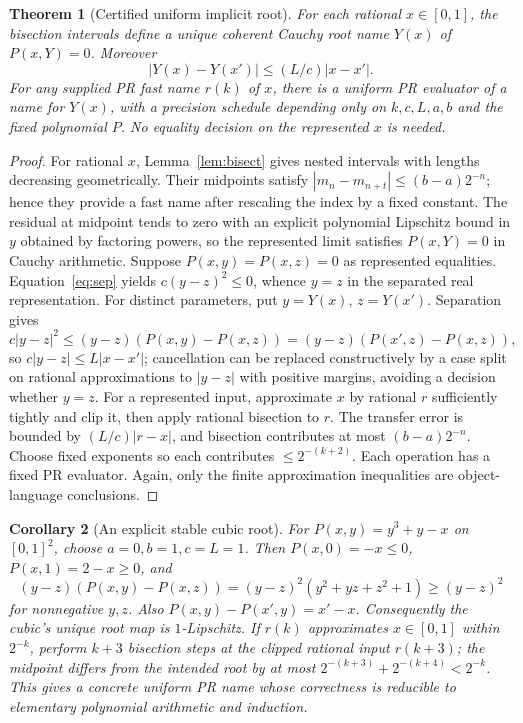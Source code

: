 \documentclass[11pt]{article}
\newtheorem{theorem}{Theorem}[section]
\newtheorem{corollary}[theorem]{Corollary}
\begin{document}
\begin{theorem}[Certified uniform implicit root]\label{thm:implicit}
For each rational $x\in[0,1]$, the bisection intervals define a unique coherent Cauchy root name $Y(x)$ of $P(x,Y)=0$. Moreover
\[
|Y(x)-Y(x')|\le (L/c)|x-x'|.
\]
For any supplied PR fast name $r(k)$ of $x$, there is a uniform PR evaluator of a name for $Y(x)$, with a precision schedule depending only on $k,c,L,a,b$ and the fixed polynomial $P$. No equality decision on the represented $x$ is needed.
\end{theorem}
\begin{proof}
For rational $x$, Lemma~\ref{lem:bisect} gives nested intervals with lengths decreasing geometrically. Their midpoints satisfy $|m_n-m_{n+t}|\le(b-a)2^{-n}$; hence they provide a fast name after rescaling the index by a fixed constant. The residual at midpoint tends to zero with an explicit polynomial Lipschitz bound in $y$ obtained by factoring powers, so the represented limit satisfies $P(x,Y)=0$ in Cauchy arithmetic. Suppose $P(x,y)=P(x,z)=0$ as represented equalities. Equation~\eqref{eq:sep} yields $c(y-z)^2\le0$, whence $y=z$ in the separated real representation. For distinct parameters, put $y=Y(x)$, $z=Y(x')$. Separation gives
\[
c|y-z|^2\le(y-z)(P(x,y)-P(x,z))
= (y-z)(P(x',z)-P(x,z)),
\]
so $c|y-z|\le L|x-x'|$; cancellation can be replaced constructively by a case split on rational approximations to $|y-z|$ with positive margins, avoiding a decision whether $y=z$. For a represented input, approximate $x$ by rational $r$ sufficiently tightly and clip it, then apply rational bisection to $r$. The transfer error is bounded by $(L/c)|r-x|$, and bisection contributes at most $(b-a)2^{-n}$. Choose fixed exponents so each contributes $\le2^{-(k+2)}$. Each operation has a fixed PR evaluator. Again, only the finite approximation inequalities are object-language conclusions.
\end{proof}

\begin{corollary}[An explicit stable cubic root]
For $P(x,y)=y^3+y-x$ on $[0,1]^2$, choose $a=0,b=1,c=L=1$. Then $P(x,0)=-x\le0$, $P(x,1)=2-x\ge0$, and
\[
(y-z)(P(x,y)-P(x,z))=(y-z)^2(y^2+yz+z^2+1)\ge(y-z)^2
\]
for nonnegative $y,z$. Also $P(x,y)-P(x',y)=x'-x$. Consequently the cubic's unique root map is $1$-Lipschitz. If $r(k)$ approximates $x\in[0,1]$ within $2^{-k}$, perform $k+3$ bisection steps at the clipped rational input $r(k+3)$; the midpoint differs from the intended root by at most $2^{-(k+3)}+2^{-(k+4)}<2^{-k}$. This gives a concrete uniform PR name whose correctness is reducible to elementary polynomial arithmetic and induction.
\end{corollary}
\end{document}
